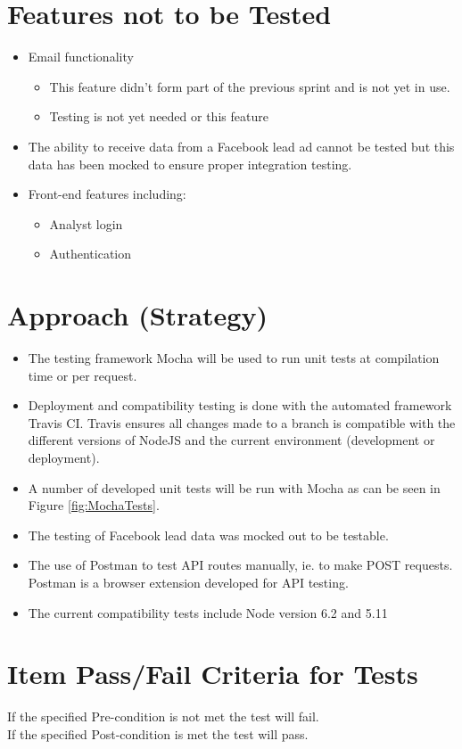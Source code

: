 \documentclass{article}
\begin{document}
\cleardoublepage
\section{Features not to be Tested}
\begin{itemize}
	\item Email functionality
	\begin{itemize}
		\item This feature didn't form part of the previous sprint and is not yet in use.
		\item Testing is not yet needed or this feature
	\end{itemize}
	\item The ability to receive data from a Facebook lead ad cannot be tested but this data has been mocked to ensure proper integration testing.
	\item Front-end features including:
	\begin{itemize}
		\item Analyst login
		\item Authentication
	\end{itemize}
\end{itemize}

\section{Approach (Strategy)}
\begin{itemize}
	\item The testing framework Mocha will be used to run unit tests at compilation time or per request.
	\item Deployment and compatibility testing is done with the automated framework Travis CI. Travis ensures all changes made to a branch is compatible with the different versions of NodeJS and the current environment (development or deployment).
	\item A number of developed unit tests will be run with Mocha as can be seen in Figure \ref{fig:MochaTests}.
	\item The testing of Facebook lead data was mocked out to be testable. 
	\item The use of Postman to test API routes manually, ie. to make POST requests. Postman is a browser extension developed for API testing.
	\item The current compatibility tests include Node version 6.2 and 5.11 
\end{itemize}

\section{Item Pass/Fail Criteria for Tests}
If the specified Pre-condition is not met the test will fail. \\
If the specified Post-condition is met the test will pass.
\end{document}
